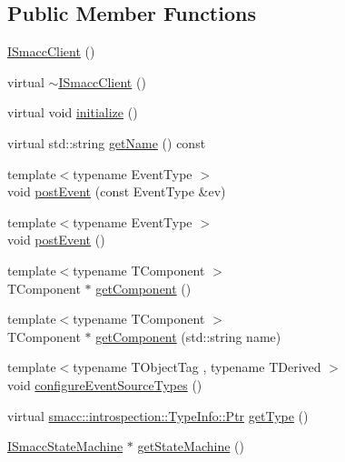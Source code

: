 \subsection*{Public Member Functions}
\begin{DoxyCompactItemize}
\item 
\hyperlink{classsmacc_1_1ISmaccClient_a40222ad8b9b7962755434025b1fd5ae7}{I\+Smacc\+Client} ()
\item 
virtual \hyperlink{classsmacc_1_1ISmaccClient_a030e17771bf2e404a6fad97273c4d7f4}{$\sim$\+I\+Smacc\+Client} ()
\item 
virtual void \hyperlink{classsmacc_1_1ISmaccClient_a974ebb6ad6cf812e7b9de6b78b3d901f}{initialize} ()
\item 
virtual std\+::string \hyperlink{classsmacc_1_1ISmaccClient_a8c3ce19f182e71909c5dc6263d25be69}{get\+Name} () const
\item 
{\footnotesize template$<$typename Event\+Type $>$ }\\void \hyperlink{classsmacc_1_1ISmaccClient_a46cbc0d695214efe40d29247323bfc80}{post\+Event} (const Event\+Type \&ev)
\item 
{\footnotesize template$<$typename Event\+Type $>$ }\\void \hyperlink{classsmacc_1_1ISmaccClient_a21a79203cb44fc717d4d977c190327c6}{post\+Event} ()
\item 
{\footnotesize template$<$typename T\+Component $>$ }\\T\+Component $\ast$ \hyperlink{classsmacc_1_1ISmaccClient_adef78db601749ca63c19e74a27cb88cc}{get\+Component} ()
\item 
{\footnotesize template$<$typename T\+Component $>$ }\\T\+Component $\ast$ \hyperlink{classsmacc_1_1ISmaccClient_ad72cba3ce7c5b3bd3977747dc6d5fb69}{get\+Component} (std\+::string name)
\item 
{\footnotesize template$<$typename T\+Object\+Tag , typename T\+Derived $>$ }\\void \hyperlink{classsmacc_1_1ISmaccClient_a643285b93f2bd33987e0d0d1a12caf10}{configure\+Event\+Source\+Types} ()
\item 
virtual \hyperlink{classsmacc_1_1introspection_1_1TypeInfo_aa6ffd9c39811d59f7c771941b7fad860}{smacc\+::introspection\+::\+Type\+Info\+::\+Ptr} \hyperlink{classsmacc_1_1ISmaccClient_ae7faf4e40510c73810e6b0ef9fec8f33}{get\+Type} ()
\item 
\hyperlink{classsmacc_1_1ISmaccStateMachine}{I\+Smacc\+State\+Machine} $\ast$ \hyperlink{classsmacc_1_1ISmaccClient_aec51d4712404cb9882b86e4c854bb93a}{get\+State\+Machine} ()

\end{DoxyCompactItemize}
